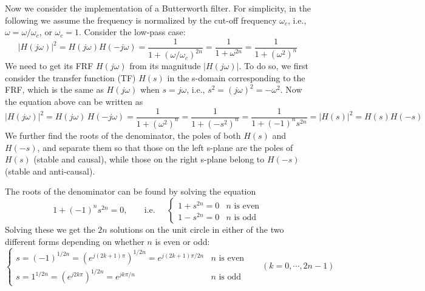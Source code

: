   Now we consider the implementation of a Butterworth filter. For 
  simplicity, in the following we assume the frequency is normalized 
  by the cut-off frequency $\omega_c$, i.e., $\omega=\omega/\omega_c$, 
  or $\omega_c=1$. Consider the low-pass case:
  \[
  |H(j\omega)|^2=H(j\omega)H(-j\omega)
  =\frac{1}{1+(\omega/\omega_c)^{2n}}
  =\frac{1}{1+\omega^{2n}}=\frac{1}{1+(\omega^2)^n}
  \]
  We need to get its FRF $H(j\omega)$ from its magnitude $|H(j\omega)|$.
  To do so, we first consider the transfer function (TF) $H(s)$ in the 
  s-domain corresponding to the FRF, which is the same as $H(j\omega)$ 
  when $s=j\omega$, i.e., $s^2=(j\omega)^2=-\omega^2$. Now the equation 
  above can be written as
  \[
  |H(j\omega)|^2=H(j\omega)\,H(-j\omega)
  =\frac{1}{1+(\omega^2)^n}=\frac{1}{1+(-s^2)^n}
  =\frac{1}{1+(-1)^ns^{2n}}=|H(s)|^2=H(s) H(-s)
  \]
  We further find the roots of the denominator, the poles of both $H(s)$
  and $H(-s)$, and separate them so that those on the left s-plane are 
  the poles of $H(s)$ (stable and causal), while those on the right 
  s-plane belong to $H(-s)$ (stable and anti-causal).

  The roots of the denominator can be found by solving the equation
  \[
  1+(-1)^ns^{2n}=0,\;\;\;\;\;\;\;\mbox{i.e.}\;\;\;\;\;
  \left\{\begin{array}{ll}
  1+s^{2n}=0 & \mbox{$n$ is even}\\
  1-s^{2n}=0 & \mbox{$n$ is odd}\end{array}\right.
  \]
  Solving these we get the $2n$ solutions on the unit circle in
  either of the two different forms depending on whether $n$ is even 
  or odd:
  \[
  \left\{\begin{array}{ll}
  s=(-1)^{1/2n}=(e^{j(2k+1)\pi})^{1/2n}=e^{j(2k+1)\pi/2n} & \mbox{$n$ is even}\\
  s=1^{1/2n}=(e^{j2k\pi})^{1/2n}=e^{jk\pi/n} & \mbox{$n$ is odd}
  \end{array}\right.\;\;\;\;\;\;(k=0,\cdots,2n-1)
  \]


